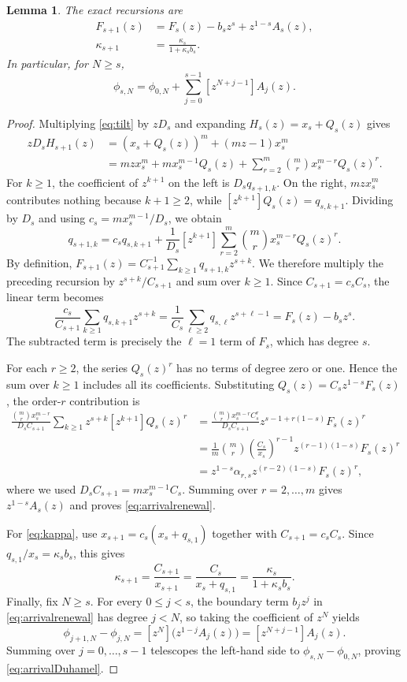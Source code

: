 \documentclass[11pt,letterpaper,reqno]{amsart}
\numberwithin{equation}{section}
\theoremstyle{plain}
\newtheorem{lemma}[theorem]{Lemma}
\theoremstyle{remark}
\begin{document}
\begin{lemma}\label{lem:arrival}
The exact recursions are
\begin{align}
 F_{s+1}(z)&=F_s(z)-b_sz^s+z^{1-s}A_s(z),\label{eq:arrivalrenewal}\\
 \kappa_{s+1}&=\frac{\kappa_s}{1+\kappa_sb_s}.\label{eq:kappa}
\end{align}
In particular, for $N\ge s$,
\begin{equation}\label{eq:arrivalDuhamel}
 \phi_{s,N}=\phi_{0,N}+\sum_{j=0}^{s-1}[z^{N+j-1}]A_j(z).
\end{equation}
\end{lemma}
\begin{proof}
Multiplying \eqref{eq:tilt} by $zD_s$ and expanding $H_s(z)=x_s+Q_s(z)$ gives
\[
\begin{aligned}
 zD_sH_{s+1}(z)
 &= (x_s+Q_s(z))^m+(mz-1)x_s^m\\
 &= mz x_s^m+mx_s^{m-1}Q_s(z)
 +\sum_{r=2}^m\binom mr x_s^{m-r}Q_s(z)^r.
\end{aligned}
\]
For $k\ge1$, the coefficient of $z^{k+1}$ on the left is $D_sq_{s+1,k}$. On the right, $mz x_s^m$ contributes nothing because $k+1\ge2$, while $[z^{k+1}]Q_s(z)=q_{s,k+1}$. Dividing by $D_s$ and using $c_s=mx_s^{m-1}/D_s$, we obtain
\[
 q_{s+1,k}=c_sq_{s,k+1}+
 \frac1{D_s}[z^{k+1}]\sum_{r=2}^m\binom mr x_s^{m-r}Q_s(z)^r.
\]
By definition, $F_{s+1}(z)=C_{s+1}^{-1}\sum_{k\ge1}q_{s+1,k}z^{s+k}$. We therefore multiply the preceding recursion by $z^{s+k}/C_{s+1}$ and sum over $k\ge1$. Since $C_{s+1}=c_sC_s$, the linear term becomes
\[
 \frac{c_s}{C_{s+1}}\sum_{k\ge1}q_{s,k+1}z^{s+k}
 =\frac1{C_s}\sum_{\ell\ge2}q_{s,\ell}z^{s+\ell-1}
 =F_s(z)-b_sz^s.
\]
The subtracted term is precisely the $\ell=1$ term of $F_s$, which has degree $s$.

For each $r\ge2$, the series $Q_s(z)^r$ has no terms of degree zero or one. Hence the sum over $k\ge1$ includes all its coefficients. Substituting $Q_s(z)=C_sz^{1-s}F_s(z)$, the order-$r$ contribution is
\[
\begin{aligned}
 \frac{\binom mr x_s^{m-r}}{D_sC_{s+1}}
   \sum_{k\ge1}z^{s+k}[z^{k+1}]Q_s(z)^r
 &=\frac{\binom mr x_s^{m-r}C_s^r}{D_sC_{s+1}}
   z^{s-1+r(1-s)}F_s(z)^r\\
 &=\frac1m\binom mr\left(\frac{C_s}{x_s}\right)^{r-1}
   z^{(r-1)(1-s)}F_s(z)^r\\
 &=z^{1-s}\alpha_{r,s}z^{(r-2)(1-s)}F_s(z)^r,
\end{aligned}
\]
where we used $D_sC_{s+1}=mx_s^{m-1}C_s$. Summing over $r=2,\ldots,m$ gives $z^{1-s}A_s(z)$ and proves \eqref{eq:arrivalrenewal}.

For \eqref{eq:kappa}, use $x_{s+1}=c_s(x_s+q_{s,1})$ together with $C_{s+1}=c_sC_s$. Since $q_{s,1}/x_s=\kappa_sb_s$, this gives
\[
 \kappa_{s+1}=\frac{C_{s+1}}{x_{s+1}}=\frac{C_s}{x_s+q_{s,1}}
 =\frac{\kappa_s}{1+\kappa_sb_s}.
\]
Finally, fix $N\ge s$. For every $0\le j<s$, the boundary term $b_jz^j$ in \eqref{eq:arrivalrenewal} has degree $j<N$, so taking the coefficient of $z^N$ yields
\[
 \phi_{j+1,N}-\phi_{j,N}
 =[z^N]\bigl(z^{1-j}A_j(z)\bigr)
 =[z^{N+j-1}]A_j(z).
\]
Summing over $j=0,\ldots,s-1$ telescopes the left-hand side to $\phi_{s,N}-\phi_{0,N}$, proving \eqref{eq:arrivalDuhamel}.
\end{proof}
\end{document}
